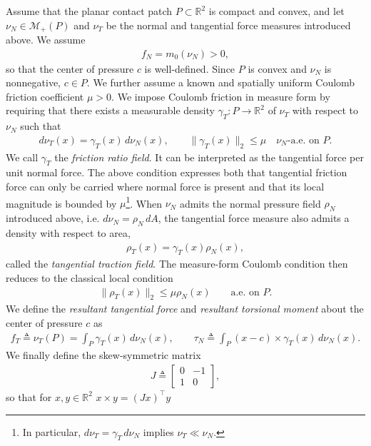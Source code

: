 \documentclass[11pt,a4paper]{article}
\theoremstyle{proposition}
\begin{document}
Assume that the planar contact patch $P\subset\mathbb R^2$ is compact and convex,
and let $\nu_N\in\mathcal M_+(P)$ and $\nu_T$ be the normal and tangential force
measures introduced above. We assume
\begin{align}
f_N=m_0(\nu_N)>0,
\end{align}
so that the center of pressure $c$ is well-defined. Since $P$ is convex and
$\nu_N$ is nonnegative, $c\in P$.
We further assume a known and spatially uniform Coulomb friction coefficient
$\mu>0$.
We impose Coulomb friction in measure form by requiring that there exists a
measurable density $\gamma_T:P\rightarrow\mathbb R^2$ of $\nu_T$ with respect
to $\nu_N$ such that
\begin{align}
\label{eq:coulomb_measure}
d\nu_T(x)=\gamma_T(x)\,d\nu_N(x),
\qquad
\|\gamma_T(x)\|_2\le\mu
\quad \nu_N\text{-a.e. on }P.
\end{align}
We call $\gamma_T$ the \textit{friction ratio field}. It can be interpreted as
the tangential force per unit normal force. 
The above condition expresses both that tangential friction force can only be carried where normal force is present
and that its local magnitude is bounded by $\mu$\footnote{In particular, $d\nu_T=\gamma_T\,d\nu_N$ implies
$\nu_T\ll\nu_N$.}. When $\nu_N$ admits the normal pressure field $\rho_N$ introduced above, i.e. $d\nu_N=\rho_N\,dA$, the tangential force measure also admits a density with respect to area,
\begin{align}
\rho_T(x)=\gamma_T(x)\rho_N(x),
\end{align}
called the \textit{tangential traction field}. The measure-form Coulomb condition then reduces to the classical local condition
\begin{align}
\label{eq:coulomb_local}
\|\rho_T(x)\|_2\le\mu\rho_N(x)
\qquad \text{a.e. on }P.
\end{align}
We define the \textit{resultant tangential force} and \textit{resultant torsional moment} about the center of pressure $c$ as
\begin{align}
f_T \triangleq \nu_T(P)
= \int_P\gamma_T(x)\,d\nu_N(x),
\qquad
\tau_N \triangleq
\int_P (x-c)\times\gamma_T(x)\,d\nu_N(x).
\end{align}
We finally define the skew-symmetric matrix
\begin{align}
J \triangleq
\begin{bmatrix}
0&-1\\
1&0
\end{bmatrix},
\end{align}
so that for $x,y\in\mathbb R^2$ $x\times y=(Jx)^\top y$
\end{document}
